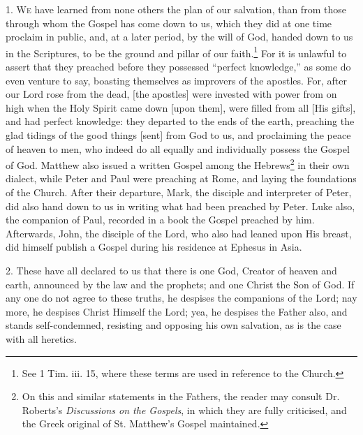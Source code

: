 1. \textsc{We} have learned from none others the plan of our salvation, than from those through whom the Gospel has come down to us, which they did at one time proclaim in public, and, at a later period, by the will of God, handed down to us in the Scriptures, to be the ground and pillar of our faith.\footnote{See 1 Tim. iii. 15, where these terms are used in reference to the Church.} For it is unlawful to assert that they preached before they possessed “perfect knowledge,” as some do even venture to say, boasting themselves as improvers of the apostles. For, after our Lord rose from the dead, [the apostles] were invested with power from on high when the Holy Spirit came down [upon them], were filled from all [His gifts], and had perfect knowledge: they departed to the ends of the earth, preaching the glad tidings of the good things [sent] from God to us, and proclaiming the peace of heaven to men, who indeed do all equally and individually possess the Gospel of God. Matthew also issued a written Gospel among the Hebrews\footnote{On this and similar statements in the Fathers, the reader may consult Dr. Roberts’s \emph{Discussions on the Gospels}, in which they are fully criticised, and the Greek original of St. Matthew’s Gospel maintained.} in their own dialect, while Peter and Paul were preaching at Rome, and laying the foundations of the Church. After their departure, Mark, the disciple and interpreter of Peter, did also hand down to us in writing what had been preached by Peter. Luke also, the companion of Paul, recorded in a book the Gospel preached by him. Afterwards, John, the disciple of the Lord, who also had leaned upon His breast, did himself publish a Gospel during his residence at Ephesus in Asia.

2. These have all declared to us that there is one God, Creator of heaven and earth, announced  by the law and the prophets; and one Christ the Son of God. If any one do not agree to these truths, he despises the companions of the Lord; nay more, he despises Christ Himself the Lord; yea, he despises the Father also, and stands self-condemned, resisting and opposing his own salvation, as is the case with all heretics.


